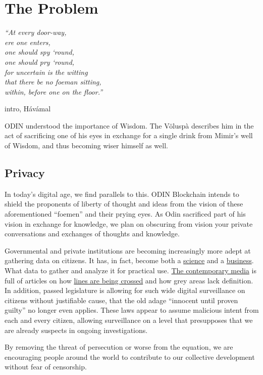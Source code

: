 \section{​The Problem}
\epigraph{\itshape
``At every door-way,\\
ere one enters, \\
one should spy ‘round,\\
one should pry ‘round,\\
for uncertain is the witting\\
that there be no foeman sitting,\\
within, before one on the floor.''}{intro, H\'av\'amal}

ODIN understood the importance of Wisdom. The V\"olusp\`a describes him in the act of  sacrificing one of his eyes in exchange for a single drink from Mimir's well of Wisdom, and thus becoming wiser himself as well.

\subsection{Privacy}
In today's digital age, we find parallels to this. ODIN Blockchain intends to shield the proponents of liberty of thought and ideas from the vision of these aforementioned ``foemen'' and their prying eyes. As Odin sacrificed part of his vision in exchange for knowledge, we plan on obscuring from vision your private conversations and exchanges of thoughts and knowledge. 

Governmental and private institutions are becoming increasingly more adept at gathering data on citizens. It has, in fact, become both a \href{https://patents.google.com/patent/US20110087529A1/en}{science} and a \href{https://patents.google.com/patent/US5974396A/en}{business}. What data to gather and analyze it for practical use. \href{https://www.theguardian.com/news/series/cambridge-analytica-files}{The contemporary media} is full of articles on how \href{https://wikileaks.org/}{lines are being crossed} and how grey areas lack definition.  In addition, passed legislature is allowing for such wide digital surveillance on citizens without justifiable cause, that the old adage ``innocent until proven guilty'' no longer even applies. These laws appear to assume malicious intent from each and every citizen, allowing surveillance on a level that presupposes that we are already suspects in ongoing investigations.

By removing the threat of persecution or worse from the equation, we are encouraging people around the world to contribute to our collective development without fear of censorship.

